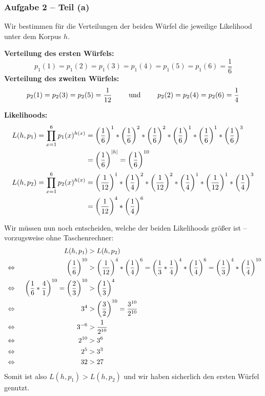 \documentclass{beamer}
\begin{document}
\begin{frame} \frametitle{Aufgabe 2 -- Teil (a)}
	\justifying \footnotesize
	Wir bestimmen für die Verteilungen der beiden Würfel die jeweilige Likelihood unter dem Korpus $h$.
	
	\textbf{Verteilung des ersten Würfels:}
	\begin{equation*}
		p_1(1) = p_1(2) = p_1(3) = p_1(4) = p_1(5) = p_1(6) = \frac{1}{6}
	\end{equation*}
	\textbf{Verteilung des zweiten Würfels:}
	\begin{equation*}
		p_2(1) = p_2(3) = p_2(5) = \frac{1}{12} 
		\qquad \text{ und } \qquad 
		p_2(2) = p_2(4) = p_2(6) = \frac{1}{4}
	\end{equation*}

	\textbf{Likelihoods:}
	\begin{align*}
		L(h, p_1) = \prod_{x=1}^6 p_1(x)^{h(x)} 
		&= \left( \frac{1}{6} \right)^1 * \left( \frac{1}{6} \right)^2 * \left( \frac{1}{6} \right)^2 * \left( \frac{1}{6} \right)^1 * \left( \frac{1}{6} \right)^1 * \left( \frac{1}{6} \right)^3 \\
		&= \left( \frac{1}{6} \right)^{\left| h \right|} = \left( \frac{1}{6} \right)^{10} \\
		L(h, p_2) = \prod_{x=1}^6 p_2(x)^{h(x)} 
		&= \left( \frac{1}{12} \right)^1 * \left( \frac{1}{4} \right)^2 * \left( \frac{1}{12} \right)^2 * \left( \frac{1}{4} \right)^1 * \left( \frac{1}{12} \right)^1 * \left( \frac{1}{4} \right)^3 \\
		&= \left( \frac{1}{12} \right)^4 * \left( \frac{1}{4} \right)^{6} 
	\end{align*}
\end{frame}

\begin{frame}
	\footnotesize
	Wir müssen nun noch entscheiden, welche der beiden Likelihoods größer ist -- vorzugsweise ohne Taschenrechner:
	\begin{align*}
		&&L(h, p_1) &> L(h, p_2)  \\
		\enskip \Leftrightarrow \enskip 
		&&\left( \frac{1}{6} \right)^{10} &> \left( \frac{1}{12} \right)^4 * \left( \frac{1}{4} \right)^6 = \left( \frac{1}{3} * \frac{1}{4} \right)^4 * \left( \frac{1}{4} \right)^6 = \left( \frac{1}{3} \right)^4 * \left( \frac{1}{4} \right)^{10} \\
		\enskip \Leftrightarrow \enskip && \left( \frac{1}{6} * \frac{4}{1} \right)^{10} = \left( \frac{2}{3} \right)^{10} &> \left( \frac{1}{3} \right)^4 \\
		\enskip \Leftrightarrow \enskip &&
		3^4 &> \left( \frac{3}{2} \right)^{10} = \frac{3^{10}}{2^{10}} \\
		\enskip \Leftrightarrow \enskip && 3^{-6} &> \frac{1}{2^{10}} \\
		\enskip \Leftrightarrow \enskip && 2^{10} &> 3^6 \\
		\enskip \Leftrightarrow \enskip && 2^{5} &> 3^3 \\
		\enskip \Leftrightarrow \enskip && 32 &> 27 \\
	\end{align*}
	Somit ist also $L(h, p_1) > L(h, p_2)$ und wir haben sicherlich den ersten Würfel genutzt.
\end{frame}
\end{document}
